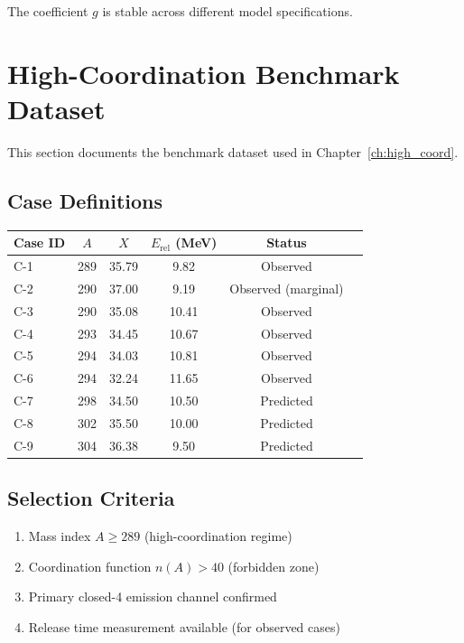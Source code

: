 The coefficient $g$ is stable across different model specifications.

\section{High-Coordination Benchmark Dataset}
\label{sec:q:benchmark}

This section documents the benchmark dataset used in Chapter~\ref{ch:high_coord}.

\subsection{Case Definitions}

\begin{center}
\begin{tabular}{lccccc}
    \toprule
    Case ID & $A$ & $X$ & $E_{\text{rel}}$ (MeV) & Status \\
    \midrule
    C-1 & 289 & 35.79 & 9.82 & Observed \\
    C-2 & 290 & 37.00 & 9.19 & Observed (marginal) \\
    C-3 & 290 & 35.08 & 10.41 & Observed \\
    C-4 & 293 & 34.45 & 10.67 & Observed \\
    C-5 & 294 & 34.03 & 10.81 & Observed \\
    C-6 & 294 & 32.24 & 11.65 & Observed \\
    C-7 & 298 & 34.50 & 10.50 & Predicted \\
    C-8 & 302 & 35.50 & 10.00 & Predicted \\
    C-9 & 304 & 36.38 & 9.50 & Predicted \\
    \bottomrule
\end{tabular}
\end{center}

\subsection{Selection Criteria}

\begin{enumerate}
    \item Mass index $A \geq 289$ (high-coordination regime)
    \item Coordination function $n(A) > 40$ (forbidden zone)
    \item Primary closed-4 emission channel confirmed
    \item Release time measurement available (for observed cases)
\end{enumerate}

